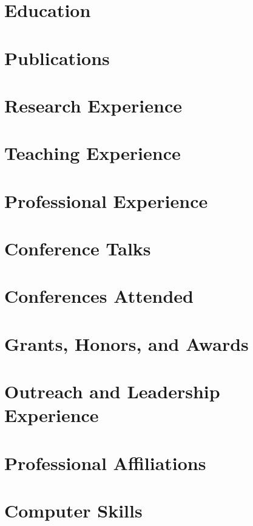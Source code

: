 \documentclass{resume}
\begin{document}
    

%     

\section{Education}
    
    
    
    

\medskip
\section{Publications}
    

\bigskip
\section{Research Experience}
    
    
    
    
    

\bigskip
\section{Teaching Experience}
    
    

\bigskip
\section{Professional Experience}
    

\bigskip
\section{Conference Talks}
    

\medskip
\section{Conferences Attended}
    

\bigskip
\section{Grants, Honors, and Awards}
    

\bigskip
\section{Outreach and Leadership Experience}
    

\bigskip
\section{Professional Affiliations}
    

\bigskip
\section{Computer Skills}
    
    
    
    
\end{document}
